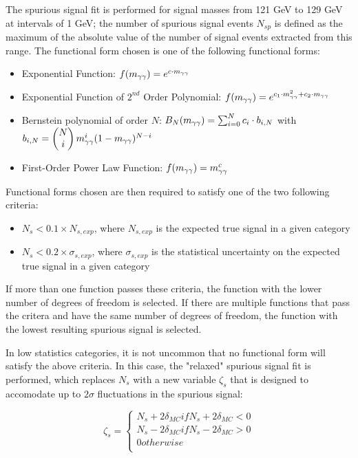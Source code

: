 The spurious signal fit is performed for signal masses from 121 GeV to 129 GeV at intervals of 1 GeV; the number of spurious signal events $N_{sp}$ is defined as the maximum of the absolute value of the number of signal events extracted from this range. The functional form chosen is one of the following functional forms:

\begin{itemize}
\item Exponential Function: $f(m_{\gamma\gamma}) = e^{c\cdot m_{\gamma\gamma}}$
\item Exponential Function of $2^{nd}$ Order Polynomial: $f(m_{\gamma\gamma}) = e^{c_1\cdot m^2_{\gamma\gamma}+c_2\cdot m_{\gamma\gamma}}$
\item Bernstein polynomial of order $N$: $B_{N}(m_{\gamma\gamma}) = \sum_{i=0}^N c_i\cdot b_{i,N}$ with ${b_{i,N} = \begin{pmatrix}N\\i\end{pmatrix}m_{\gamma\gamma}^i (1-m_{\gamma\gamma})^{N-i}}$
\item First-Order Power Law Function: $f(m_{\gamma\gamma}) = m_{\gamma\gamma}^c$
\end{itemize}

Functional forms chosen are then required to satisfy one of the two following criteria:

\begin{itemize}
\item $N_{s} < 0.1 \times N_{s,exp}$, where $N_{s,exp}$ is the expected true signal in a given category
\item $N_{s} < 0.2 \times \sigma_{s,exp}$, where $\sigma_{s,exp}$ is the statistical uncertainty on the expected true signal in a given category
\end{itemize}

If more than one function passes these criteria, the function with the lower number of degrees of freedom is selected. If there are multiple functions that pass the critera and have the same number of degrees of freedom, the function with the lowest resulting spurious signal is selected.

In low statistics categories, it is not uncommon that no functional form will satisfy the above criteria. In this case, the "relaxed" spurious signal fit is performed, which replaces $N_{s}$ with a new variable $\zeta_{s}$ that is designed to accomodate up to $2\sigma$ fluctuations in the spurious signal:

\[\zeta_{s} = \begin{cases} 
      N_{s} + 2 \delta_{MC} if  N_{s} + 2 \delta_{MC} < 0\\
      N_{s} - 2 \delta_{MC} if  N_{s} - 2 \delta_{MC} > 0\\
      0 otherwise \\
   \end{cases}
\]


